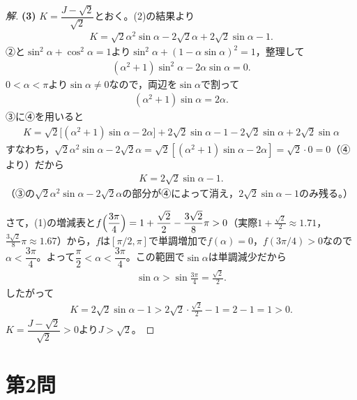 \documentclass[../main.tex]{subfiles}
\begin{document}
\begin{proof}[解]
  \textbf{(3)} $K=\dfrac{J-\sqrt2}{\sqrt2}$とおく。(2)の結果より
  \begin{align*}
    K=\sqrt2\alpha^2\sin\alpha-2\sqrt2\alpha+2\sqrt2\sin\alpha-1.\tag{③}
  \end{align*}
  ②と$\sin^2\alpha+\cos^2\alpha=1$より$\sin^2\alpha+(1-\alpha\sin\alpha)^2=1$，整理して
  \begin{align*}
    (\alpha^2+1)\sin^2\alpha-2\alpha\sin\alpha=0.
  \end{align*}
  $0<\alpha<\pi$より$\sin\alpha\neq0$なので，両辺を$\sin\alpha$で割って
  \begin{align*}
    (\alpha^2+1)\sin\alpha=2\alpha.\tag{④}
  \end{align*}
  ③に④を用いると
  \begin{align*}
    K=\sqrt2\bigl[(\alpha^2+1)\sin\alpha-2\alpha\bigr]+2\sqrt2\sin\alpha-1-2\sqrt2\sin\alpha+2\sqrt2\sin\alpha
  \end{align*}
  すなわち，$\sqrt2\alpha^2\sin\alpha-2\sqrt2\alpha=\sqrt2[(\alpha^2+1)\sin\alpha-2\alpha]=\sqrt2\cdot0=0$（④より）だから
  \begin{align*}
    K=2\sqrt2\sin\alpha-1.
  \end{align*}
  （③の$\sqrt2\alpha^2\sin\alpha-2\sqrt2\alpha$の部分が④によって消え，$2\sqrt2\sin\alpha-1$のみ残る。）

  さて，(1)の増減表と$f\Bigl(\dfrac{3\pi}4\Bigr)=1+\dfrac{\sqrt2}2-\dfrac{3\sqrt2}8\pi>0$（実際$1+\frac{\sqrt2}2\approx1.71$，$\frac{3\sqrt2}8\pi\approx1.67$）から，$f$は$[\pi/2,\pi]$で単調増加で$f(\alpha)=0$，$f(3\pi/4)>0$なので$\alpha<\dfrac{3\pi}4$。よって$\dfrac\pi2<\alpha<\dfrac{3\pi}4$。この範囲で$\sin\alpha$は単調減少だから
  \begin{align*}
    \sin\alpha>\sin\frac{3\pi}4=\frac{\sqrt2}2.
  \end{align*}
  したがって
  \begin{align*}
    K=2\sqrt2\sin\alpha-1>2\sqrt2\cdot\frac{\sqrt2}2-1=2-1=1>0.
  \end{align*}
  $K=\dfrac{J-\sqrt2}{\sqrt2}>0$より$J>\sqrt2$。
\end{proof}

\newpage

\section*{第2問}
\end{document}

